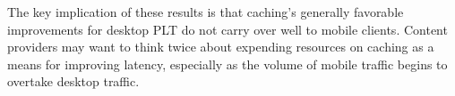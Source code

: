 
The key implication of these results is that caching's generally favorable
improvements for desktop PLT do not carry over well to mobile clients. Content providers may want to think twice about expending resources on caching as a means for improving latency, especially as the volume of mobile traffic begins to overtake desktop traffic.

